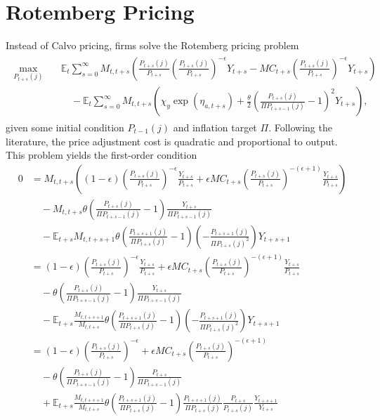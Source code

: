 \documentclass[12 pt, oneside]{article}
\theoremstyle{definition}
\theoremstyle{definition}
\theoremstyle{definition}
\newcommand{\E}{\mathbb{E}}
\begin{document}
\section{Rotemberg Pricing}\label{sec:rotemberg}
Instead of Calvo pricing, firms solve the Rotemberg pricing problem
\begin{align}
  \begin{split}
  \max_{P_{t + s}(j)} & \quad \E_t\sum_{s = 0}^\infty M_{t, t + s}\left(\frac{P_{t + s}(j)}{P_{t + s}}\left(\frac{P_{t + s}(j)}{P_{t + s}}\right)^{ - \epsilon}Y_{t + s} - MC_{t + s}\left(\frac{P_{t + s}(j)}{P_{t + s}}\right)^{-\epsilon} Y_{t + s}\right)\\
  & \quad\quad - \E_t\sum_{s = 0}^\infty M_{t, t + s}\left( \chi_y \exp(\eta_{a, t + s}) + \frac{\theta}{2}\left(\frac{P_{t + s}(j)}{\Pi P_{t + s - 1}(j)} - 1\right)^2 Y_{t + s}\right),
  \end{split}
\end{align}
given some initial condition $P_{t - 1}(j)$ and inflation target $\Pi$. Following the literature, the price adjustment cost is quadratic and proportional to output. This problem yields the first-order condition
\begin{align*}
  0 & = M_{t, t + s}\left((1 - \epsilon)\left(\frac{P_{t + s}(j)}{P_{t + s}}\right)^{-\epsilon}\frac{Y_{t + s}}{P_{t + s}} + \epsilon MC_{t + s}\left(\frac{P_{t + s}(j)}{P_{t + s}}\right)^{-(\epsilon + 1)} \frac{Y_{t + s}}{P_{t + s}}\right)\\
    & \quad - M_{t, t + s}\theta \left(\frac{P_{t + s}(j)}{\Pi P_{t + s - 1}(j)} - 1\right)\frac{Y_{t + s}}{\Pi P_{t + s - 1}(j)}\\
    &\quad - \E_{t + s}M_{t, t + s + 1} \theta \left(\frac{P_{t + s + 1}(j)}{\Pi P_{t + s}(j)} - 1\right)\left(-\frac{P_{t + s + 1}(j)}{\Pi P_{t + s}(j)^2}\right) Y_{t + s + 1}\\
    & = (1 - \epsilon)\left(\frac{P_{t + s}(j)}{P_{t + s}}\right)^{-\epsilon}\frac{Y_{t + s}}{P_{t + s}} + \epsilon MC_{t + s}\left(\frac{P_{t + s}(j)}{P_{t + s}}\right)^{-(\epsilon + 1)} \frac{Y_{t + s}}{P_{t + s}}\\
    & \quad - \theta \left(\frac{P_{t + s}(j)}{\Pi P_{t + s - 1}(j)} - 1\right)\frac{Y_{t + s}}{\Pi P_{t + s - 1}(j)} \\
    &\quad - \E_{t + s}\frac{M_{t, t + s + 1}}{M_{t, t + s}} \theta \left(\frac{P_{t + s + 1}(j)}{\Pi P_{t + s}(j)} - 1\right)\left(-\frac{P_{t + s + 1}(j)}{\Pi P_{t + s}(j)^2}\right) Y_{t + s + 1}\\
    & = (1 - \epsilon)\left(\frac{P_{t + s}(j)}{P_{t + s}}\right)^{-\epsilon} + \epsilon MC_{t + s}\left(\frac{P_{t + s}(j)}{P_{t + s}}\right)^{-(\epsilon + 1)} \\
    & \quad - \theta \left(\frac{P_{t + s}(j)}{\Pi P_{t + s - 1}(j)} - 1\right)\frac{P_{t + s}}{\Pi P_{t + s - 1}(j)} \\
    &\quad + \E_{t + s}\frac{M_{t, t + s + 1}}{M_{t, t + s}} \theta \left(\frac{P_{t + s + 1}(j)}{\Pi P_{t + s}(j)} - 1\right)\frac{P_{t + s + 1}(j)}{\Pi P_{t + s}(j)}\frac{P_{t + s}}{P_{t + s}(j)}\frac{Y_{t + s + 1}}{Y_{t + s}}
\end{align*}
\end{document}

